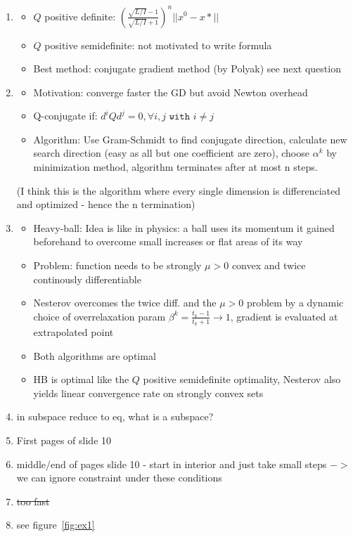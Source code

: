 \documentclass{report}
\begin{document}
\begin{enumerate}
\item \begin{itemize}
	\item $Q$ positive definite: $\left(\frac{\sqrt{L/I}-1}{\sqrt{L/I} + 1}\right)^n || x^0  - x* ||$
	\item $Q$ positive semidefinite: not motivated to write formula
	\item Best method: conjugate gradient method (by Polyak) see next question
\end{itemize}
\item \begin{itemize}
	\item Motivation: converge faster the GD but avoid Newton overhead
	\item Q-conjugate if: $d^i  Q d^j = 0, \forall i, j \texttt{ with } i \neq j$
	\item Algorithm: 
	Use Gram-Schmidt to find conjugate direction, calculate new search direction (easy as all but one coefficient are zero), choose $\alpha^k$ by minimization method, algorithm terminates after at most n steps. 
\end{itemize}
(I think this is the algorithm where every single dimension is differenciated and optimized - hence the n termination)
\item \begin{itemize}
	\item Heavy-ball: Idea is like in physics: a ball uses its momentum it gained beforehand to overcome small increases or flat areas of its way
	\item Problem: function needs to be strongly $\mu > 0$ convex and twice continously differentiable
	\item Nesterov overcomes the twice diff. and the $\mu > 0$ problem by a dynamic choice of overrelaxation param $\beta^k = \frac{t_k - 1}{t_k + 1} \rightarrow 1$, gradient is evaluated at extrapolated point
	\item Both algorithms are optimal
	\item HB is optimal like the $Q$ positive semidefinite optimality, Nesterov also yields linear convergence rate on strongly convex sets
	\end{itemize}
\item in subspace reduce to eq, what is a subspace?
\item First pages of slide 10
\item middle/end of pages slide 10 - start in interior and just take small steps $->$ we can ignore constraint under these conditions
\item \sout{too fast}
\item see figure~\ref{fig:ex1}


\end{enumerate}
\end{document}
